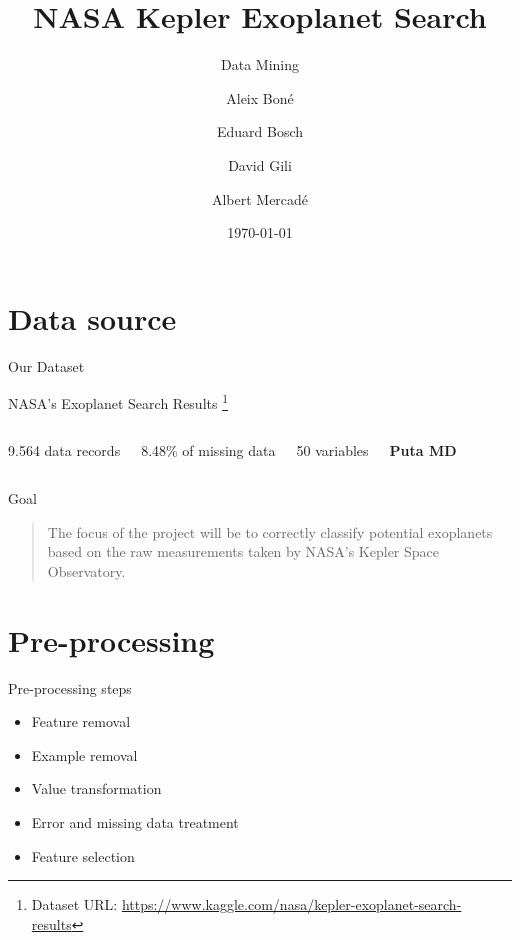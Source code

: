 \documentclass[aspectratio=169]{beamer}
\title{NASA Kepler Exoplanet Search}
\subtitle{Data Mining}
\date{\today}
\author{
Aleix Boné \and
Eduard Bosch \and
David Gili \and
Albert Mercadé
}
\institute{UPC}
\begin{document}
  \maketitle
  
\section{Data source}
\begin{frame}{Our Dataset}
\begin{center}
    NASA's Exoplanet Search Results \footnote[frame]{Dataset URL: \url{https://www.kaggle.com/nasa/kepler-exoplanet-search-results}}
\vspace{5 mm}

\begin{columns}[t]
    9.564 data records
    
    8.48\% of missing data
    
    50 variables
    
    
    \bfseries
    \Huge
    Puta MD
    
    \normalsize
\end{columns}

\end{center}
\end{frame}


\begin{frame}{Goal}
\begin{quote}
The focus of the project will be to correctly classify potential exoplanets based
on the raw measurements taken by NASA's Kepler Space Observatory.
\end{quote}
\end{frame}  

\section{Pre-processing}
\begin{frame}{Pre-processing steps}
\large
\begin{itemize}
     \itemsep0.5em
     \item Feature removal
     \item Example removal 
     \item Value transformation
     \item Error and missing data treatment
     \item Feature selection
\end{itemize}
\normalsize
\end{frame}
\end{document}
